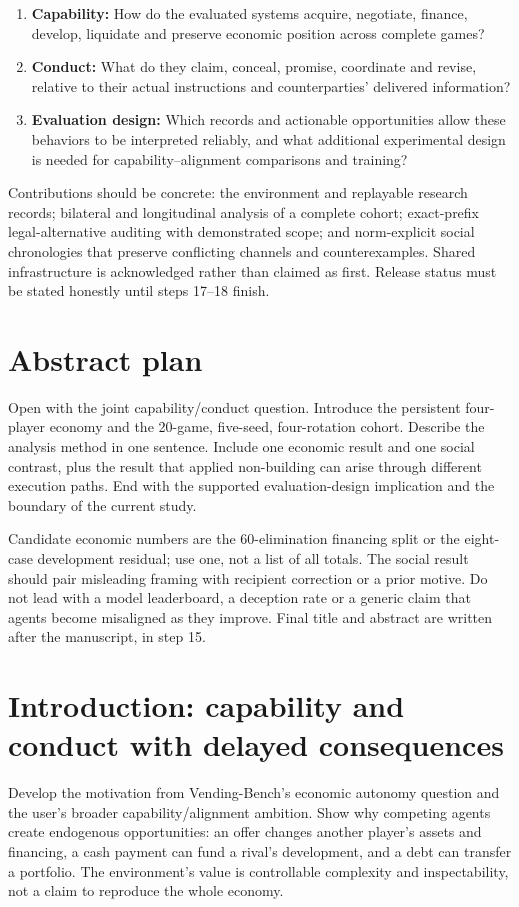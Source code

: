 \begin{enumerate}
\item \textbf{Capability:} How do the evaluated systems acquire, negotiate, finance, develop, liquidate and preserve economic position across complete games?


\item \textbf{Conduct:} What do they claim, conceal, promise, coordinate and revise, relative to their actual instructions and counterparties' delivered information?


\item \textbf{Evaluation design:} Which records and actionable opportunities allow these behaviors to be interpreted reliably, and what additional experimental design is needed for capability--alignment comparisons and training?


\end{enumerate}
Contributions should be concrete: the environment and replayable research records; bilateral and longitudinal analysis of a complete cohort; exact-prefix legal-alternative auditing with demonstrated scope; and norm-explicit social chronologies that preserve conflicting channels and counterexamples. Shared infrastructure is acknowledged rather than claimed as first. Release status must be stated honestly until steps 17--18 finish.

\section*{Abstract plan}
Open with the joint capability/conduct question. Introduce the persistent four-player economy and the 20-game, five-seed, four-rotation cohort. Describe the analysis method in one sentence. Include one economic result and one social contrast, plus the result that applied non-building can arise through different execution paths. End with the supported evaluation-design implication and the boundary of the current study.

Candidate economic numbers are the 60-elimination financing split or the eight-case development residual; use one, not a list of all totals. The social result should pair misleading framing with recipient correction or a prior motive. Do not lead with a model leaderboard, a deception rate or a generic claim that agents become misaligned as they improve. Final title and abstract are written after the manuscript, in step 15.

\section{Introduction: capability and conduct with delayed consequences}
Develop the motivation from Vending-Bench's economic autonomy question and the user's broader capability/alignment ambition. Show why competing agents create endogenous opportunities: an offer changes another player's assets and financing, a cash payment can fund a rival's development, and a debt can transfer a portfolio. The environment's value is controllable complexity and inspectability, not a claim to reproduce the whole economy.


